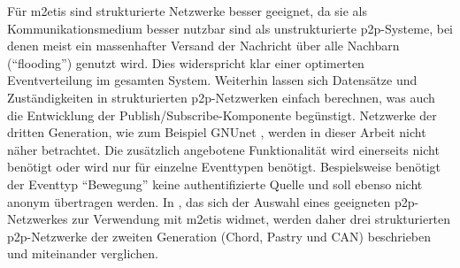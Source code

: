 Für \ac{m2etis} sind strukturierte Netzwerke besser geeignet, da sie als Kommunikationsmedium besser nutzbar sind als unstrukturierte p2p-Systeme, bei denen meist ein massenhafter Versand der Nachricht über alle Nachbarn (\enquote{flooding}) genutzt wird. Dies widerspricht klar einer optimerten Eventverteilung im gesamten System. Weiterhin lassen sich Datensätze und Zuständigkeiten in strukturierten p2p-Netzwerken einfach berechnen, was auch die Entwicklung der Publish/Subscribe-Komponente begünstigt. Netzwerke der dritten Generation, wie zum Beispiel GNUnet \cite{Bennett2002GNet}, werden in dieser Arbeit nicht näher betrachtet. Die zusätzlich angebotene Funktionalität wird einerseits nicht benötigt oder wird nur für einzelne Eventtypen benötigt. Bespielsweise benötigt der Eventtyp \enquote{Bewegung} keine authentifizierte Quelle und soll ebenso nicht anonym übertragen werden. In , das sich der Auswahl eines geeigneten p2p-Netzwerkes zur Verwendung mit \ac{m2etis} widmet, werden daher drei strukturierten \ac{p2p}-Netzwerke der zweiten Generation (Chord, Pastry und CAN) beschrieben und miteinander verglichen.


